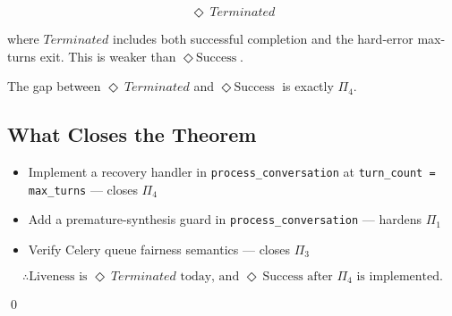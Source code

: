\[ \Diamond\ Terminated \]

where $Terminated$ includes both successful completion and the hard-error
max-turns exit. This is weaker than $\Diamond\ \text{Success}$.

The gap between $\Diamond\ Terminated$ and $\Diamond\ \text{Success}$ is exactly $\Pi_4$.

\subsection*{What Closes the Theorem}

\begin{itemize}
  \item Implement a recovery handler in \texttt{process\_conversation} at
        \texttt{turn\_count = max\_turns} — closes $\Pi_4$
  \item Add a premature-synthesis guard in \texttt{process\_conversation} —
        hardens $\Pi_1$
  \item Verify Celery queue fairness semantics — closes $\Pi_3$
\end{itemize}

\[ \therefore \text{Liveness is } \Diamond\ Terminated \text{ today, and } \Diamond\ \text{Success} \text{ after } \Pi_4 \text{ is implemented.} \]

\qed